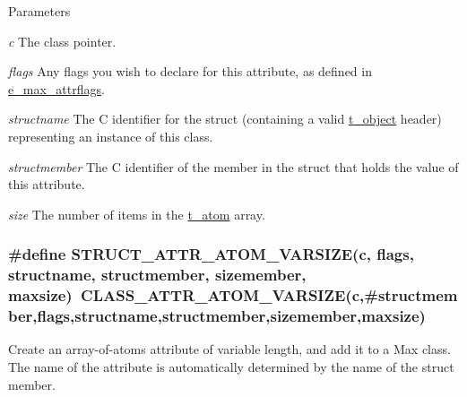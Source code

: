 \begin{DoxyParams}{Parameters}
\item[{\em c}]The class pointer. \item[{\em flags}]Any flags you wish to declare for this attribute, as defined in \hyperlink{group__attr_gaf296cfc6741bb19207f6ed8062809115}{e\_\-max\_\-attrflags}. \item[{\em structname}]The C identifier for the struct (containing a valid \hyperlink{structt__object}{t\_\-object} header) representing an instance of this class. \item[{\em structmember}]The C identifier of the member in the struct that holds the value of this attribute. \item[{\em size}]The number of items in the \hyperlink{structt__atom}{t\_\-atom} array. \end{DoxyParams}
\hypertarget{group__attr_gab119784ef725f2f192877fd3acd5701a}{
\subsubsection[{STRUCT\_\-ATTR\_\-ATOM\_\-VARSIZE}]{\setlength{\rightskip}{0pt plus 5cm}\#define STRUCT\_\-ATTR\_\-ATOM\_\-VARSIZE(c, \/  flags, \/  structname, \/  structmember, \/  sizemember, \/  maxsize)~CLASS\_\-ATTR\_\-ATOM\_\-VARSIZE(c,\#structmember,flags,structname,structmember,sizemember,maxsize)}}
\label{group__attr_gab119784ef725f2f192877fd3acd5701a}


Create an array-\/of-\/atoms attribute of variable length, and add it to a Max class. The name of the attribute is automatically determined by the name of the struct member.


